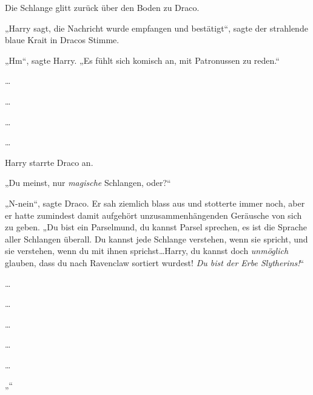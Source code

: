 Die Schlange glitt zurück über den Boden zu Draco.

„Harry sagt, die Nachricht wurde empfangen und bestätigt“, sagte der strahlende blaue Krait in Dracos Stimme.

„Hm“, sagte Harry. „Es fühlt sich komisch an, mit Patronussen zu reden.“

…

…

…

…



Harry starrte Draco an.

„Du meinst, nur \emph{magische} Schlangen, oder?“

„N-nein“, sagte Draco. Er sah ziemlich blass aus und stotterte immer noch, aber er hatte zumindest damit aufgehört unzusammenhängenden Geräusche von sich zu geben. „Du bist ein Parselmund, du kannst Parsel sprechen, es ist die Sprache aller Schlangen überall. Du kannst jede Schlange verstehen, wenn sie spricht, und sie verstehen, wenn du mit ihnen sprichst…Harry, du kannst doch \emph{unmöglich} glauben, dass du nach Ravenclaw sortiert wurdest! \emph{Du bist der Erbe Slytherins!}“

…

…

…

…

…

„“

